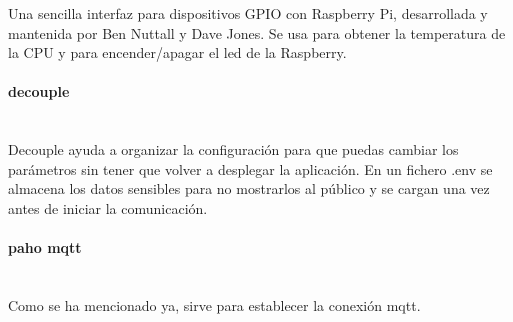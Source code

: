 {Una sencilla interfaz para dispositivos GPIO con Raspberry Pi, desarrollada y mantenida por Ben Nuttall y Dave Jones. Se usa para obtener la temperatura de la CPU y para encender/apagar el led de la Raspberry. \cite{gpiozero}

\paragraph{decouple} \hspace{0pt} \\

Decouple ayuda a organizar la configuración para que puedas cambiar los parámetros sin tener que volver a desplegar la aplicación. En un fichero .env se almacena los datos sensibles para no mostrarlos al público y se cargan una vez antes de iniciar la comunicación. \cite{decouple}

\paragraph{paho mqtt} \hspace{0pt} \\

Como se ha mencionado ya, sirve para establecer la conexión mqtt. \cite{paho-mqtt}
}